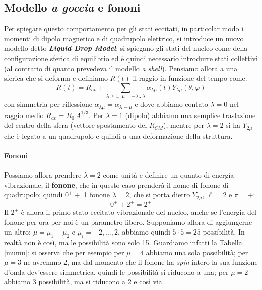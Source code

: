 \subsection{Modello \textit{a goccia} e fononi}
Per spiegare questo comportamento per gli stati eccitati, in particolar modo i momenti di dipolo magnetico e di quadrupolo elettrico, si introduce un nuovo modello detto \textbf{\textit{Liquid Drop Model}}: si spiegano gli stati del nucleo come  della configurazione sferica di equilibrio ed è quindi necessario introdurre stati collettivi (al contrario di quanto prevedeva il modello \textit{a shell}). Pensiamo allora a una  sferica che si deforma e definiamo $R(t)$ il raggio in funzione del tempo come:
$$R(t) = R_{av} + \sum_{\lambda\geq 1,\; \mu=-\lambda \dots \lambda}\alpha_{\lambda \mu}(t) Y_{\lambda\mu}(\theta,\varphi)$$
con simmetria per riflessione $\alpha_{\lambda\mu} = \alpha_{\lambda\,-\mu}$ e dove abbiamo contato $\lambda=0$ nel raggio medio $R_{av}=R_0\,A^{1/3}$. Per $\lambda=1$ (dipolo) abbiamo una semplice traslazione del centro della sfera (vettore spostamento del $R_{CM}$), mentre per $\lambda = 2$ si ha $Y_{2\mu}$ che è legato a un quadrupolo e quindi a una deformazione della struttura.

\paragraph{Fononi} Possiamo allora prendere $\lambda=2 $ come unità e definire un quanto di energia vibrazionale, il \textbf{fonone}, che  in questo caso prenderà il nome di fonone di quadrupolo; quindi $0^+ + $ 1 fonone $\lambda=2$, che si porta dietro $Y_{2\mu}$, $\ell =2$ e $\pi=+$:
$$0^+ + 2^+ = 2^+$$
Il $2^+$ è allora il primo stato eccitato vibrazionale del nucleo, anche se l'energia del fonone per ora per noi è un parametro libero. Supponiamo allora di aggiungerne un altro: $\mu = \mu_1 + \mu_2$ e $\mu_i = -2, \dots, 2$, abbiamo quindi $5\cdot 5 = 25$ possibilità. In realtà non è così, ma le possibilità sono solo 15. Guardiamo infatti la Tabella \ref{mumu}: si osserva che per esempio per $\mu=4$ abbiamo una sola possibilità; per $\mu=3$ ne avremmo 2, ma dal momento che il fonone ha \textit{spin} intero la sua funzione d'onda dev'essere simmetrica, quindi le possibilità si riducono a una; per $\mu = 2$ abbiamo 3 possibilità, ma si riducono a 2 e così via. 

